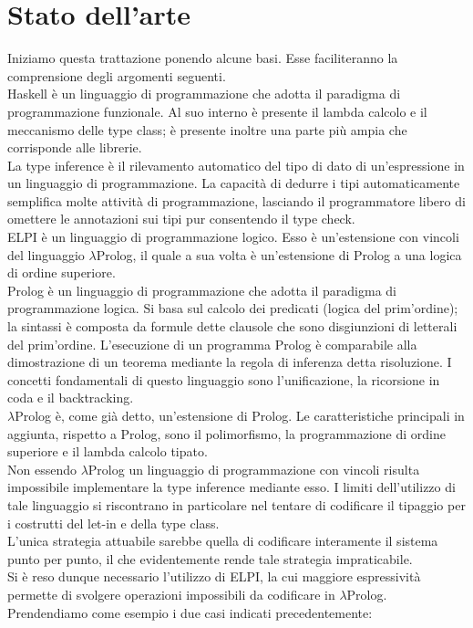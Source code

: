 \documentclass[12pt,a4paper,openright,twoside]{report}
\begin{document}
\section{Stato dell'arte}
Iniziamo questa trattazione ponendo alcune basi. Esse faciliteranno la comprensione degli argomenti seguenti.\\
Haskell è un linguaggio di programmazione che adotta il paradigma di programmazione funzionale. Al suo interno è presente il lambda calcolo e il meccanismo delle type class; è presente inoltre una parte più ampia che corrisponde alle librerie.\\
La type inference è il rilevamento automatico del tipo di dato di un'espressione in un linguaggio di programmazione. La capacità di dedurre i tipi automaticamente semplifica molte attività di programmazione, lasciando il programmatore libero di omettere le annotazioni sui tipi pur consentendo il type check.\\
ELPI è un linguaggio di programmazione logico. Esso è un'estensione con vincoli del linguaggio $\lambda$Prolog, il quale a sua volta è un'estensione di Prolog a una logica di ordine superiore.\\
Prolog è un linguaggio di programmazione che adotta il paradigma di programmazione logica. Si basa sul calcolo dei predicati (logica del prim'ordine); la sintassi è composta da formule dette clausole che sono disgiunzioni di letterali del prim'ordine. L'esecuzione di un programma Prolog è comparabile alla dimostrazione di un teorema mediante la regola di inferenza detta risoluzione. I concetti fondamentali di questo linguaggio sono l'unificazione, la ricorsione in coda e il backtracking.\\
$\lambda$Prolog è, come già detto, un'estensione di Prolog. Le caratteristiche principali in aggiunta, rispetto a Prolog, sono il polimorfismo, la programmazione di ordine superiore e il lambda calcolo tipato.\\
Non essendo $\lambda$Prolog un linguaggio di programmazione con vincoli risulta impossibile implementare la type inference mediante esso. I limiti dell'utilizzo di tale linguaggio si riscontrano in particolare nel tentare di codificare il tipaggio per i costrutti del let-in e della type class.\\
L'unica strategia attuabile sarebbe quella di codificare interamente il sistema punto per punto, il che evidentemente rende tale strategia impraticabile.\\
Si è reso dunque necessario l'utilizzo di ELPI, la cui maggiore espressività permette di svolgere operazioni impossibili da codificare in $\lambda$Prolog. Prendendiamo come esempio i due casi indicati precedentemente:
\end{document}
